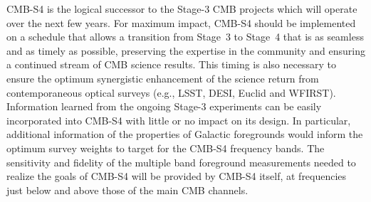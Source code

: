%


CMB-S4 is the logical successor to the Stage-3 CMB projects which will operate over the next few years. For maximum impact, CMB-S4 should be implemented on a schedule that allows a transition from Stage~3 to Stage~4 that is as seamless and as timely as possible, preserving the expertise in the community and ensuring a continued stream of CMB science results. This timing is also necessary to ensure the optimum synergistic enhancement of the science return from contemporaneous optical surveys (e.g., LSST, DESI, Euclid and WFIRST).   Information learned from the ongoing Stage-3 experiments can be easily incorporated into CMB-S4 with little or no impact on its design. In particular, additional information of the properties of Galactic foregrounds would inform the optimum survey weights to target for the CMB-S4 frequency bands.  The sensitivity and fidelity of the multiple band foreground measurements needed to realize the goals of CMB-S4 will be provided by CMB-S4 itself, at frequencies just below and above those of the main CMB channels. 

